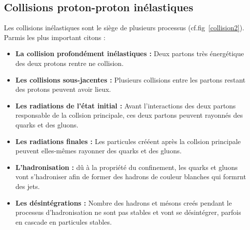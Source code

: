 \subsection{Collisions proton-proton inélastiques}
Les collisions inélastiques sont le siège de plusieurs processus (cf.fig~\ref{collision2}). Parmis les plus important citons :
\begin{itemize}[label=$\bullet$]
	\item \textbf{La collision profondément inélastiques :} Deux partons très énergétique des deux protons rentre ne collision.
	\item \textbf{Les collisions sous-jacentes :} Plusieurs collisions entre les partons restant des protons peuvent avoir lieux.
	\item \textbf{Les radiations de l'état initial :} Avant l'interactions des deux partons responsable de la collsion principale, ces deux partons peuvent rayonnés des quarks et des gluons.
	\item \textbf{Les radiations finales :} Les particules crééent après la collsion principale peuvent elles-mêmes rayonner des quarks et des gluons.
	\item \textbf{L'hadronisation :} dû à la propriété du confinement, les quarks et gluons vont s'hadroniser afin de former des hadrons de couleur blanches qui formrnt des jets.
	\item \textbf{Les désintégrations :} Nombre des hadrons et mésons creés pendant le processus d'hadronisation ne sont pas stables et vont se désintégrer, parfois en cascade en particules stables.
\end{itemize}


